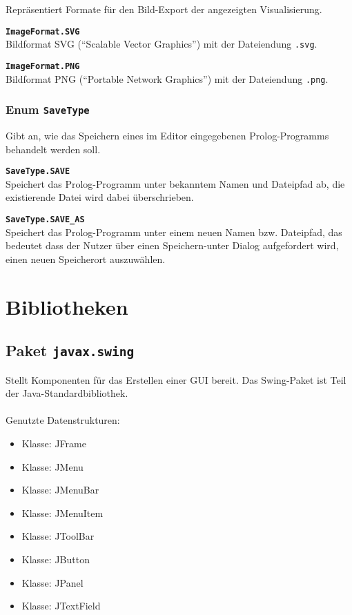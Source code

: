 \documentclass[parskip=full,11pt,twoside]{scrartcl}
\begin{document}
Repräsentiert Formate für den Bild-Export der angezeigten Visualisierung.

\textbf{\texttt{ImageFormat.SVG}}\\
Bildformat SVG (\enquote{Scalable Vector Graphics}) mit der Dateiendung \texttt{.svg}.

\textbf{\texttt{ImageFormat.PNG}}\\
Bildformat PNG (\enquote{Portable Network Graphics}) mit der Dateiendung \texttt{.png}.

\subsubsection{Enum \texttt{SaveType}}

Gibt an, wie das Speichern eines im Editor eingegebenen Prolog-Programms behandelt werden soll.

\textbf{\texttt{SaveType.SAVE}}\\
Speichert das Prolog-Programm unter bekanntem Namen und Dateipfad ab, die existierende Datei wird dabei überschrieben.

\textbf{\texttt{SaveType.SAVE\_AS}}\\
Speichert das Prolog-Programm unter einem neuen Namen bzw. Dateipfad, das bedeutet dass der Nutzer über einen Speichern-unter Dialog aufgefordert wird, einen neuen Speicherort auszuwählen.

\section{Bibliotheken}

\subsection{Paket \texttt{javax.swing}}
Stellt Komponenten für das Erstellen einer GUI bereit. Das Swing-Paket ist Teil der Java-Standardbibliothek.\\\\Genutzte Datenstrukturen:

\begin{multicols}{2}
\begin{itemize}
	\item Klasse: JFrame
	\item Klasse: JMenu	
	\item Klasse: JMenuBar
	\item Klasse: JMenuItem
	\item Klasse: JToolBar
	\item Klasse: JButton
	\item Klasse: JPanel
	\item Klasse: JTextField
\end{itemize}
\end{multicols}
\end{document}
